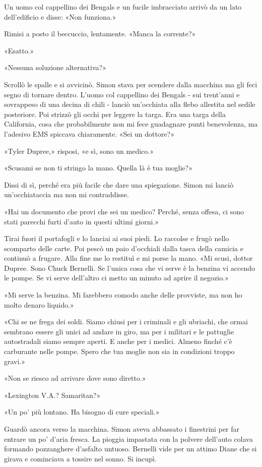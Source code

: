 Un uomo col cappellino dei Bengals e un fucile imbracciato arrivò da un
lato dell'edificio e disse: «Non funziona.»

Rimisi a posto il beccuccio, lentamente. «Manca la corrente?»

«Esatto.»

«Nessuna soluzione alternativa?»

Scrollò le spalle e si avvicinò. Simon stava per scendere dalla macchina
ma gli feci segno di tornare dentro. L'uomo col cappellino dei Bengals -
sui trent'anni e sovrappeso di una decina di chili - lanciò un'occhiata
alla flebo allestita nel sedile posteriore. Poi strizzò gli occhi per
leggere la targa. Era una targa della California, cosa che probabilmente
non mi fece guadagnare punti benevolenza, ma l'adesivo EMS spiccava
chiaramente. «Sei un dottore?»

«Tyler Dupree,» risposi, «e sì, sono un medico.»

«Scusami se non ti stringo la mano. Quella là è tua moglie?»

Dissi di sì, perché era più facile che dare una spiegazione. Simon mi
lanciò un'occhiataccia ma non mi contraddisse.

«Hai un documento che provi che sei un medico? Perché, senza offesa, ci
sono stati parecchi furti d'auto in questi ultimi giorni.»

Tirai fuori il portafogli e lo lanciai ai suoi piedi. Lo raccolse e
frugò nello scomparto delle carte. Poi pescò un paio d'occhiali dalla
tasca della camicia e continuò a frugare. Alla fine me lo restituì e mi
porse la mano. «Mi scusi, dottor Dupree. Sono Chuck Bernelli. Se l'unica
cosa che vi serve è la benzina vi accendo le pompe. Se vi serve
dell'altro ci metto un minuto ad aprire il negozio.»

«Mi serve la benzina. Mi farebbero comodo anche delle provviste, ma non
ho molto denaro liquido.»

«Chi se ne frega dei soldi. Siamo chiusi per i criminali e gli ubriachi,
che ormai sembrano essere gli unici ad andare in giro, ma per i militari
e le pattuglie autostradali siamo sempre aperti. E anche per i medici.
Almeno finché c'è carburante nelle pompe. Spero che tua moglie non sia
in condizioni troppo gravi.»

«Non se riesco ad arrivare dove sono diretto.»

«Lexington V.A.? Samaritan?»

«Un po' più lontano. Ha bisogno di cure speciali.»

Guardò ancora verso la macchina. Simon aveva abbassato i finestrini per
far entrare un po' d'aria fresca. La pioggia impastata con la polvere
dell'auto colava formando pozzanghere d'asfalto untuoso. Bernelli vide
per un attimo Diane che si girava e cominciava a tossire nel sonno. Si
incupì.

